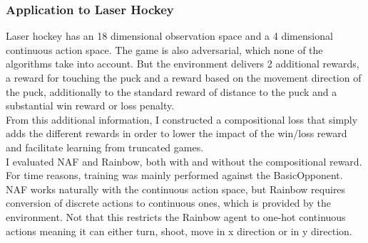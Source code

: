 \subsubsection{Application to Laser Hockey}
Laser hockey has an 18 dimensional observation space and a 4 dimensional continuous action space.
The game is also adversarial, which none of the algorithms take into account. 
But the environment delivers 2 additional rewards, a reward for touching the puck and a reward based on the movement direction of the puck, additionally to the standard reward of distance to the puck and a substantial win reward or loss penalty.\\
From this additional information, I constructed a compositional loss that simply adds the different rewards in order to lower the impact of the win/loss reward and facilitate learning from truncated games.\\
I evaluated NAF and Rainbow, both with and without the compositional reward. For time reasons, training was mainly performed against the BasicOpponent.\\
NAF works naturally with the continuous action space, but Rainbow requires conversion of discrete actions to continuous ones, which is provided by the environment. Not that this restricts the Rainbow agent to one-hot continuous actions meaning it can either turn, shoot, move in x direction or in y direction.

